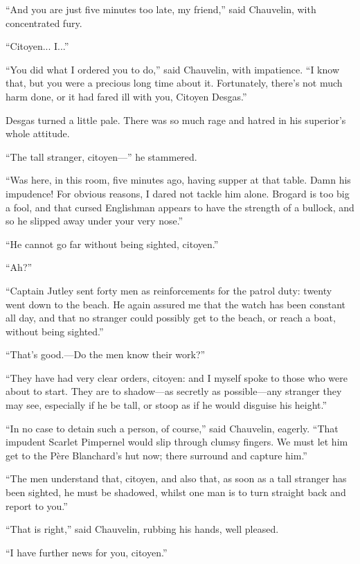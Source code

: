 \enquote{And you are just five minutes too late, my friend,} said Chauvelin, with concentrated fury.

\enquote{Citoyen... I...}

\enquote{You did what I ordered you to do,} said Chauvelin, with impatience. \enquote{I know that, but you were a precious long time about it. Fortunately, there's not much harm done, or it had fared ill with you, Citoyen Desgas.}

Desgas turned a little pale. There was so much rage and hatred in his superior's whole attitude.

\enquote{The tall stranger, citoyen---} he stammered.

\enquote{Was here, in this room, five minutes ago, having supper at that table. Damn his impudence! For obvious reasons, I dared not tackle him alone. Brogard is too big a fool, and that cursed Englishman appears to have the strength of a bullock, and so he slipped away under your very nose.}

\enquote{He cannot go far without being sighted, citoyen.}

\enquote{Ah?}

\enquote{Captain Jutley sent forty men as reinforcements for the patrol duty: twenty went down to the beach. He again assured me that the watch has been constant all day, and that no stranger could possibly get to the beach, or reach a boat, without being sighted.}

\enquote{That's good.---Do the men know their work?}

\enquote{They have had very clear orders, citoyen: and I myself spoke to those who were about to start. They are to shadow---as secretly as possible---any stranger they may see, especially if he be tall, or stoop as if he would disguise his height.}

\enquote{In no case to detain such a person, of course,} said Chauvelin, eagerly. \enquote{That impudent Scarlet Pimpernel would slip through clumsy fingers. We must let him get to the Père Blanchard's hut now; there surround and capture him.}

\enquote{The men understand that, citoyen, and also that, as soon as a tall stranger has been sighted, he must be shadowed, whilst one man is to turn straight back and report to you.}

\enquote{That is right,} said Chauvelin, rubbing his hands, well pleased.

\enquote{I have further news for you, citoyen.}

